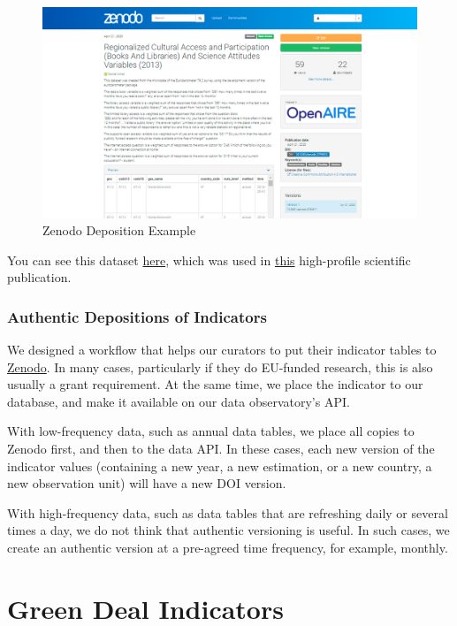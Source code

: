 \documentclass[
  a4paper,
  openany, a4paper, oneside]{book}
\begin{document}
\begin{figure}

{\centering \includegraphics[width=0.8\linewidth]{plots/screenshots/zenodo_deposition_example} 

}

\caption{Zenodo Deposition Example}\label{fig:zenodo-example}
\end{figure}

You can see this dataset \href{https://zenodo.org/record/3759811\#.YJ6R3qgzbIU}{here}, which was used in \href{https://dataandlyrics.com/publication/scholarly_pirate_libraries_2020/}{this} high-profile scientific publication.

\hypertarget{deposit-indicator}{%
\subsection{Authentic Depositions of Indicators}\label{deposit-indicator}}

We designed a workflow that helps our curators to put their indicator tables to \href{https://zenodo.org/}{Zenodo}. In many cases, particularly if they do EU-funded research, this is also usually a grant requirement. At the same time, we place the indicator to our database, and make it available on our data observatory's API.

With low-frequency data, such as annual data tables, we place all copies to Zenodo first, and then to the data API. In these cases, each new version of the indicator values (containing a new year, a new estimation, or a new country, a new observation unit) will have a new DOI version.

With high-frequency data, such as data tables that are refreshing daily or several times a day, we do not think that authentic versioning is useful. In such cases, we create an authentic version at a pre-agreed time frequency, for example, monthly.

\hypertarget{green-deal}{%
\chapter{Green Deal Indicators}\label{green-deal}}
\end{document}
